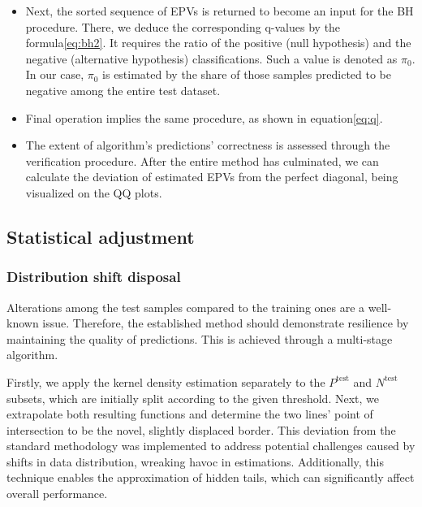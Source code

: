 \documentclass{article}
\begin{document}
\begin{enumerate}
\begin{itemize}
    \item Next, the sorted sequence of EPVs is returned to become an input for the BH procedure. There, we deduce the corresponding q-values by the formula\ref{eq:bh2}. It requires the ratio of the positive (null hypothesis) and the negative (alternative hypothesis) classifications. Such a value is denoted as $\pi_0$. In our case, $\pi_0$ is estimated by the share of those samples predicted to be negative among the entire test dataset. 
    \item Final operation implies the same procedure, as shown in equation\ref{eq:q}.
    \item The extent of algorithm's predictions' correctness is assessed through the verification procedure. After the entire method has culminated, we can calculate the deviation of estimated EPVs from the perfect diagonal, being visualized on the QQ plots. 
    \end{itemize}
\end{enumerate}

\subsection{Statistical adjustment}\label{StatAd}

\subsubsection{Distribution shift disposal}

Alterations among the test samples compared to the training ones are a well-known issue. Therefore, the established method should demonstrate resilience by maintaining the quality of predictions. This is achieved through a multi-stage algorithm.

Firstly, we apply the kernel density estimation separately to the $P^{\text{test}}$ and $N^{\text{test}}$ subsets, which are initially split according to the given threshold. Next, we extrapolate both resulting functions and determine the two lines' point of intersection to be the novel, slightly displaced border. This deviation from the standard methodology was implemented to address potential challenges caused by shifts in data distribution, wreaking havoc in estimations. Additionally, this technique enables the approximation of hidden tails, which can significantly affect overall performance. 
\end{document}
